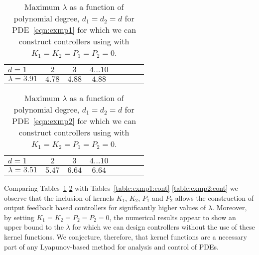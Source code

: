\documentclass[US letter, 9 pt, conference]{ieeeconf}  \usepackage{setspace}
\begin{document}
\begin{table}{}
\caption{Maximum $\lambda$ as a function of polynomial degree, $d_1=d_2=d$ for PDE~\eqref{eqn:exmp1} for which we can construct controllers using  with $K_1=K_2=P_1=P_2=0$.}
\vspace{-10pt}
\begin{center}
    \begin{tabular}{l *{7}{c}}\hline
    $d=1$ & $2$ & $3$ & $4\ldots 10$  \\ \hline
  $\lambda=3.91$   & $4.78$ & $4.88$  & $4.88$
\end{tabular}
\end{center}
\label{table:simple_lyap1:cont1}
\end{table}

\begin{table}{}
\caption{Maximum $\lambda$ as a function of polynomial degree, $d_1=d_2=d$ for PDE~\eqref{eqn:exmp2} for which we can construct controllers using  with $K_1=K_2=P_1=P_2=0$.}
\vspace{-10pt}
\begin{center}
    \begin{tabular}{l *{7}{c}}\hline
    $d=1$ & $2$ & $3$ & $4\ldots 10$  \\ \hline
  $\lambda=3.51$   & $5.47$ & $6.64$  & $6.64$
\end{tabular}
\end{center}
\label{table:simple_lyap1:cont2}
\end{table}

Comparing Tables~\ref{table:simple_lyap1:cont1}-\ref{table:simple_lyap1:cont2} with Tables~\ref{table:exmp1:cont}-\ref{table:exmp2:cont} we observe that the inclusion of kernels $K_1$, $K_2$, $P_1$ and $P_2$ allows the construction of output feedback based controllers for significantly higher values of $\lambda$. Moreover, by setting $K_1=K_2=P_2=P_2=0$, the numerical results appear to show an upper bound to the $\lambda$ for which we can design controllers without the use of these kernel functions. We conjecture, therefore, that kernel functions are a necessary part of any Lyapunov-based method for analysis and control of PDEs.
\end{document}
